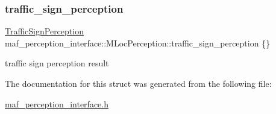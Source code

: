 \subsubsection{\texorpdfstring{traffic\+\_\+sign\+\_\+perception}{traffic\_sign\_perception}}
{\footnotesize\ttfamily \hyperlink{structmaf__perception__interface_1_1TrafficSignPerception}{Traffic\+Sign\+Perception} maf\+\_\+perception\+\_\+interface\+::\+M\+Loc\+Perception\+::traffic\+\_\+sign\+\_\+perception \{\}}



traffic sign perception result 



The documentation for this struct was generated from the following file\+:\begin{DoxyCompactItemize}
\item 
\hyperlink{maf__perception__interface_8h}{maf\+\_\+perception\+\_\+interface.\+h}\end{DoxyCompactItemize}
